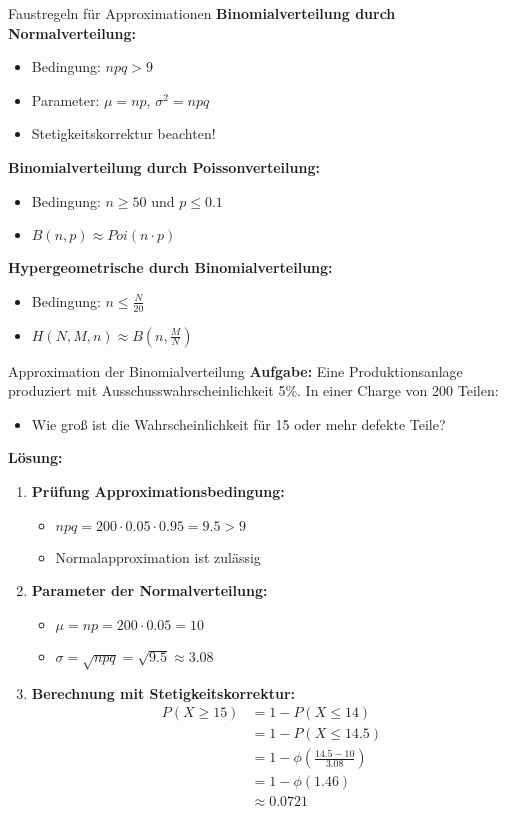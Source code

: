 \begin{concept}{Faustregeln für Approximationen}
\textbf{Binomialverteilung durch Normalverteilung:}
\begin{itemize}
  \item Bedingung: $npq > 9$
  \item Parameter: $\mu = np$, $\sigma^2 = npq$
  \item Stetigkeitskorrektur beachten!
\end{itemize}

\textbf{Binomialverteilung durch Poissonverteilung:}
\begin{itemize}
  \item Bedingung: $n \geq 50$ und $p \leq 0.1$
  \item $B(n,p) \approx Poi(n \cdot p)$
\end{itemize}

\textbf{Hypergeometrische durch Binomialverteilung:}
\begin{itemize}
  \item Bedingung: $n \leq \frac{N}{20}$
  \item $H(N,M,n) \approx B(n,\frac{M}{N})$
\end{itemize}
\end{concept}

\begin{example2}{Approximation der Binomialverteilung}
\textbf{Aufgabe:} Eine Produktionsanlage produziert mit Ausschusswahrscheinlichkeit 5\%. In einer Charge von 200 Teilen:
\begin{itemize}
\item Wie groß ist die Wahrscheinlichkeit für 15 oder mehr defekte Teile?
\end{itemize}

\textbf{Lösung:}
\begin{enumerate}
\item \textbf{Prüfung Approximationsbedingung:}
   \begin{itemize}
   \item $npq = 200 \cdot 0.05 \cdot 0.95 = 9.5 > 9$
   \item Normalapproximation ist zulässig
   \end{itemize}

\item \textbf{Parameter der Normalverteilung:}
   \begin{itemize}
   \item $\mu = np = 200 \cdot 0.05 = 10$
   \item $\sigma = \sqrt{npq} = \sqrt{9.5} \approx 3.08$
   \end{itemize}

\item \textbf{Berechnung mit Stetigkeitskorrektur:}
   \begin{align*}
   P(X \geq 15) &= 1 - P(X \leq 14) \\
   &= 1 - P(X \leq 14.5) \\
   &= 1 - \phi(\frac{14.5-10}{3.08}) \\
   &= 1 - \phi(1.46) \\
   &\approx 0.0721
   \end{align*}
\end{enumerate}
\end{example2}

